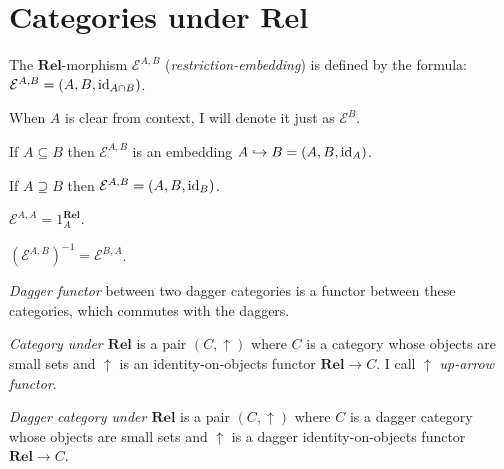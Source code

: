 \section{\texorpdfstring{Categories under $\mathbf{Rel}$}{Categories under Rel}}

\begin{defn}
  The $\mathbf{Rel}$-morphism $\mathcal{E}^{A,B}$
  (\emph{restriction-embedding}) is defined by the formula: $\mathcal{E}^{A,B}
  = (A , B , \operatorname{id}_{A \cap B})$.
  
  When $A$ is clear from context, I will denote it just as $\mathcal{E}^B$.
\end{defn}

\begin{obvious}
If $A \subseteq B$ then $\mathcal{E}^{A,B}$ is an embedding $A \hookrightarrow B
= (A , B , \operatorname{id}_A)$.
\end{obvious}

\begin{obvious}
If $A \supseteq B$ then $\mathcal{E}^{A,B} = (A , B ,
\operatorname{id}_B)$.
\end{obvious}

\begin{obvious}
$\mathcal{E}^{A,A} = 1^{\mathbf{Rel}}_A$.
\end{obvious}

\begin{obvious}
$(\mathcal{E}^{A,B})^{- 1} = \mathcal{E}^{B,A}$.
\end{obvious}

\begin{defn}
\emph{Dagger functor} between two dagger categories is a functor between
these categories, which commutes with the daggers.
\end{defn}

\begin{defn}
\emph{Category under $\mathbf{Rel}$} is a pair $(C , \uparrow)$
where $C$ is a category whose objects are small sets and $\uparrow$ is an
identity-on-objects functor $\mathbf{Rel} \rightarrow C$. I call
$\uparrow$ \emph{up-arrow functor}.
\end{defn}

\begin{defn}
  \emph{Dagger category under $\mathbf{Rel}$} is a pair $(C ,
  \uparrow)$ where $C$ is a dagger category whose objects are small sets and
  $\uparrow$ is a dagger identity-on-objects functor $\mathbf{Rel}
  \rightarrow C$.
\end{defn}

